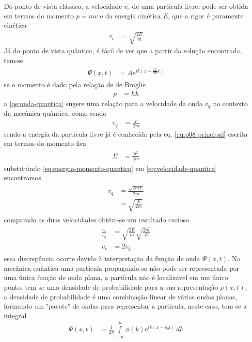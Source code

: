 \begin{prob}
\begin{sol}
		Do ponto de vista clássico, a velocidade $v_{c}$ de uma partícula livre, pode ser obtida em termos do momento $p=mv$ e da energia cinética $E$, que a rigor é puramente cinética
		\begin{align}
			v_c &= \sqrt{\frac{2E}{m}}
		\end{align}
		Já do ponto de vista quântico, é fácil de ver que a partir da solução encontrada, tem-se
		\begin{align}
				\begin{split}
					\Psi(x,t) &= A \mathrm{e}^{ik(x-\frac{\hbar k}{2m}t)} \label{qe:onda-quantica}
				\end{split}
		\end{align}
	 se o momento é dado pela relação de de Broglie
	 \begin{align}
		 p &= \hbar k
	 \end{align}
	 a \eqref{qe:onda-quantica} sugere uma relação para a velocidade da onda $v_{q}$ no contexto da mecânica quântica, como sendo
	 \begin{align}
		 \label{eq:velocidade-quantica}
		 v_{q} &= \frac{p}{2m}
	 \end{align}
	 sendo a energia da partícula livre já é conhecida pela eq. \eqref{eq:p08-principal} escrita em termos do momento fica
	 \begin{align}
		 \begin{split}
			 \label{eq:energia-momento-quantico}
			 E &= \frac{p^{2}}{2m} 
		 \end{split}	 		
	 \end{align}
	 substituindo \eqref{eq:energia-momento-quantico} em \eqref{eq:velocidade-quantica} encontramos
	 \begin{align}
	 		\begin{split}
				v_{q} &= \frac{\sqrt{2mE}}{2m}\\
							&= \sqrt{\frac{E}{2m}}
	 		\end{split}
	 \end{align}
	 comparado as duas velocidades obtêm-se um resultado curioso
	 \begin{align}
	 		\begin{split}
				\frac{v_{c}}{v_{q}} &= \sqrt{\frac{2E}{m}}\sqrt{\frac{2m}{E}}\\
				v_{c} &= 2v_{q}
	 		\end{split}
	 \end{align}
	 essa discrepância ocorre devido à interpretação da função de onda $\Psi(x,t)$. Na mecânica quântica uma partícula propagando-se não pode ser representada por uma única função de onda plana, a partícula não é localizável em um único ponto, tem-se uma densidade de probabilidade para a sua representação $\rho(x,t)$, a densidade de probabilidade é uma combinação linear de várias ondas planas, formando um "pacote" de ondas para representar a partícula, neste caso, tem-se a integral
	 \begin{align}
		 \Psi(x,t) &= \frac{1}{2 \pi}\int\limits_{-\infty}^{\infty} \phi(k)\mathrm{e}^{ik(x-v_{0}t)}\,d{k}
	 \end{align}


\end{sol}
\end{prob}

